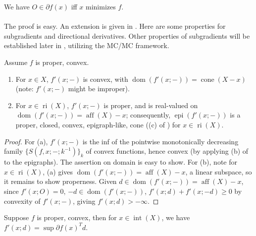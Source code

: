 \begin{prop}\label{prop:022-optimality-via-subgradient-basic}
	We have $O\in \partial f(x)$ iff $x$ minimizes $f$.
\end{prop}

\paragraph{}The proof is easy. An extension is given in . Here are some properties for subgradients and directional derivatives. Other properties of subgradients will be established later in , utilizing the MC/MC framework.

\begin{prop}\label{prop:022-properties-of-directional}
	Assume $f$ is proper, convex.
	\begin{enumerate}[label=(\alph*)]
		\item For $x\in X$, $f'(x;-)$ is convex, with $\operatorname{dom}(f'(x;-))=\operatorname{cone}(X-x)$ (note: $f'(x;-)$ might be improper).
		\item For $x\in \operatorname{ri}(X)$, $f'(x;-)$ is proper, and is real-valued on $\operatorname{dom}(f'(x;-))=\operatorname{aff}(X)-x$; consequently, $\operatorname{epi}(f'(x;-))$ is a proper, closed, convex, epigraph-like, cone ((c) of ) for $x\in \operatorname{ri}(X)$.
	\end{enumerate}
\end{prop}

\begin{proof}
	For (a), $f'(x;-)$ is the inf of the pointwise monotonically decreasing family $\{S(f,x;-; k^{-1})\}_{k}$ of convex functions, hence convex (by applying (b) of  to the epigraphs). The assertion on domain is easy to show. For (b), note for $x\in \operatorname{ri}(X)$, (a) gives $\operatorname{dom}(f'(x;-))=\operatorname{aff}(X)-x$, a linear subspace, so it remains to show properness. Given $d\in \operatorname{dom}(f'(x;-))=\operatorname{aff}(X)-x$, since $f'(x;O)=0$, $-d\in\operatorname{dom}(f'(x;-))$, $f'(x;d)+f'(x;-d)\geq 0$ by convexity of $f'(x;-)$, giving $f'(x;d)>-\infty$.
\end{proof}

\begin{coro}\label{coro:022-dir-sub-formula}
	Suppose $f$ is proper, convex, then for $x\in \operatorname{int}(X)$, we have $f'(x; d)=\sup \partial f(x)^T d$.
\end{coro}

